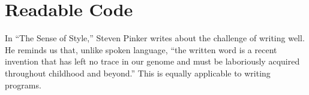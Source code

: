 \section{Readable Code}

\cite{6005readings,artofreadablecode,styleguides}

In ``The Sense of Style,'' Steven Pinker writes about the challenge of writing well. He reminds us that, unlike spoken language, ``the written word is a recent invention that has left no trace in our genome and must be laboriously acquired throughout childhood and beyond.'' This is equally applicable to writing programs.
